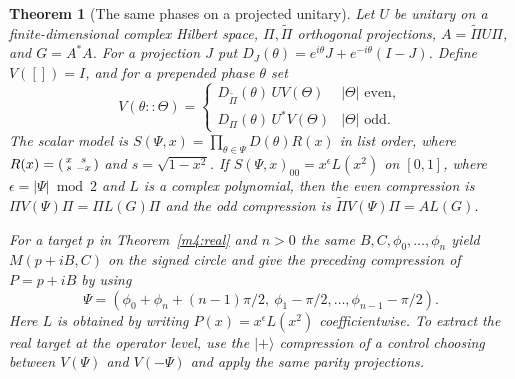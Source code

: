 \documentclass[11pt,reqno]{amsart}
\newtheorem{theorem}{Theorem}[section]
\theoremstyle{definition}
\theoremstyle{remark}
\numberwithin{equation}{section}
\begin{document}
\begin{theorem}[The same phases on a projected unitary]\label{m4:lift}
Let $U$ be unitary on a finite-dimensional complex Hilbert space, $\Pi,\widetilde\Pi$ orthogonal projections, $A=\widetilde\Pi U\Pi$, and $G=A^*A$. For a projection $J$ put $D_J(\theta)=e^{i\theta}J+e^{-i\theta}(I-J)$. Define $V([])=I$, and for a prepended phase $\theta$ set
\[
 V(\theta::\Theta)=
 \begin{cases}
 D_{\widetilde\Pi}(\theta)\,U V(\Theta)&|\Theta|\text{ even},\\
 D_\Pi(\theta)\,U^*V(\Theta)&|\Theta|\text{ odd}.
 \end{cases}
\]
The scalar model is $S(\Psi,x)=\prod_{\theta\in\Psi}D(\theta)R(x)$ in list order, where $R(x)=\begin{psmallmatrix}x&s\\s&-x\end{psmallmatrix}$ and $s=\sqrt{1-x^2}$. If $S(\Psi,x)_{00}=x^\epsilon L(x^2)$ on $[0,1]$, where $\epsilon=|\Psi|\bmod2$ and $L$ is a complex polynomial, then the even compression is $\Pi V(\Psi)\Pi=\Pi L(G)\Pi$ and the odd compression is $\widetilde\Pi V(\Psi)\Pi=A L(G)$.

For a target $p$ in Theorem~\ref{m4:real} and $n>0$ the same $B,C,\phi_0,\ldots,\phi_n$ yield $M(p+iB,C)$ on the signed circle and give the preceding compression of $P=p+iB$ by using
\[
 \Psi=(\phi_0+\phi_n+(n-1)\pi/2,\ \phi_1-\pi/2,\ldots,\phi_{n-1}-\pi/2).
\]
Here $L$ is obtained by writing $P(x)=x^\epsilon L(x^2)$ coefficientwise. To extract the real target at the operator level, use the $|+\rangle$ compression of a control choosing between $V(\Psi)$ and $V(-\Psi)$ and apply the same parity projections.
\end{theorem}
\end{document}
